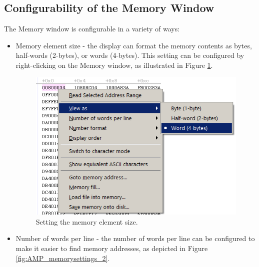 \documentclass[11pt, twoside, pdftex]{article}
\begin{document}
\subsection{Configurability of the Memory Window}

The Memory window is configurable in a variety of ways:

\begin{itemize}
\item Memory element size - the display can format the memory
contents as bytes, half-words (2-bytes), or words (4-bytes).
This setting can be configured by right-clicking on the Memory
window, as illustrated in Figure \ref{fig:AMP_memorysettings_1}.

\begin{figure}[H]
   \begin{center}
      \includegraphics[scale=0.7]{screenshots/figure38.png}
   \end{center}
   \caption{Setting the memory element size.} 
   \label{fig:AMP_memorysettings_1}
\end{figure}

\item Number of words per line - the number of words per line can
be configured to make it easier to find memory addresses, as
depicted in Figure \ref{fig:AMP_memorysettings_2}.


\end{itemize}
\end{document}
